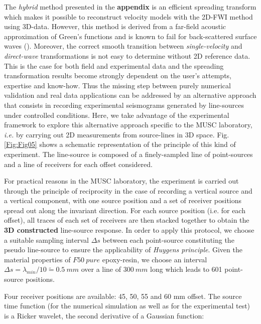 \documentclass[extra,mreferee]{gji}
\newcommand{\cmnt}[1]{}
\newenvironment{violetnote}{\par\color{BlueViolet}}{\par}
\begin{document}
\begin{violetnote}
The \textit{hybrid} method presented in the \cmnt{previous section} \textbf{appendix} is an efficient spreading transform which makes it possible to reconstruct velocity models with the 2D-FWI method using 3D-data. However, this method is derived from a far-field acoustic approximation of Green's functions and is known to fail for back-scattered surface waves (\cite{schafer2014lss,groos2014role}). Moreover, the correct smooth transition between \textit{single-velocity} and \textit{direct-wave} transformations is not easy to determine without 2D reference data. This is the case for both field and experimental data and the spreading transformation results become strongly dependent on the user's attempts, expertise and know-how.
Thus the missing step between purely numerical validation and real data applications can be addressed by an alternative approach that consists in recording experimental seismograms generated by line-sources under controlled conditions. Here, we take advantage of the experimental framework to explore this alternative approach specific to the MUSC laboratory, \textit{i.e.} by carrying out 2D measurements from source-lines in 3D space. Fig. \ref{Fig:Fig05} shows a schematic representation of the principle of this kind of experiment. The line-source is composed of a finely-sampled line of point-sources and a line of receivers for each offset considered. 

For practical reasons in the MUSC laboratory, the experiment is carried out through the principle of reciprocity in the case of recording a vertical source and a vertical component, with one source position and a set of receiver positions spread out along the invariant direction. For each source position (i.e. for each offset), all traces of each set of receivers are then stacked together to obtain the \textbf{3D constructed} line-source response. In order to apply this protocol, we choose a suitable sampling interval $\Delta s$ between each point-source constituting the pseudo line-source to ensure the applicability of \textit{Huygens principle}. Given the material properties of $F50\ pure$ epoxy-resin, we choose an interval $\Delta s=\lambda_{min}/10 \tilde{=}0.5\ mm$ over a line of $300\ mm$ long which leads to 601 point-source positions.

Four receiver positions are available: 45, 50, 55 and 60 mm offset. The source time function (for the numerical simulation as well as for the experimental test) is a Ricker wavelet, the second derivative of a Gaussian function:


\end{violetnote}
\end{document}
